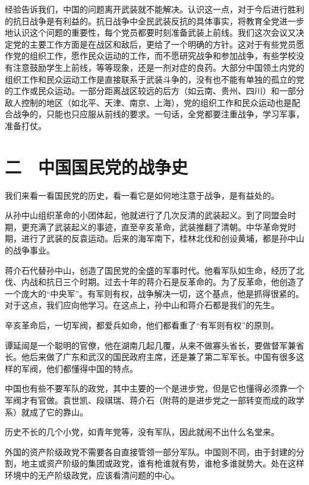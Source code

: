 经验告诉我们，中国的问题离开武装就不能解决。认识这一点，对于今后进行胜利的抗日战争是有利益的。抗日战争中全民武装反抗的具体事实，将教育全党进一步地认识这个问题的重要性，每个党员都要时刻准备武装上前线。我们这次会议又决定党的主要工作方面是在战区和敌后，更给了一个明确的方针。这对于有些党员愿作党的组织工作，愿作民众运动的工作，而不愿研究战争和参加战争，有些学校没有注意鼓励学生上前线，等等现象，还是一剂对症的良药。大部分中国领土内党的组织工作和民众运动工作是直接联系于武装斗争的，没有也不能有单独的孤立的党的工作或民众运动。一部分距离战区较远的后方（如云南、贵州、四川）和一部分敌人控制的地区（如北平、天津、南京、上海），党的组织工作和民众运动也是配合战争的，只能也只应服从前线的要求。一句话，全党都要注重战争，学习军事，准备打仗。

\section{二　中国国民党的战争史}

我们来看一看国民党的历史，看一看它是如何地注意于战争，是有益处的。

从孙中山组织革命的小团体起，他就进行了几次反清的武装起义。到了同盟会时期，更充满了武装起义的事迹，直至辛亥革命，武装推翻了清朝。中华革命党时期，进行了武装的反袁运动。后来的海军南下，桂林北伐和创设黄埔，都是孙中山的战争事业。

蒋介石代替孙中山，创造了国民党的全盛的军事时代。他看军队如生命，经历了北伐、内战和抗日三个时期。过去十年的蒋介石是反革命的。为了反革命，他创造了一个庞大的“中央军”。有军则有权，战争解决一切，这个基点，他是抓得很紧的。对于这点，我们应向他学习。在这点上，孙中山和蒋介石都是我们的先生。

辛亥革命后，一切军阀，都爱兵如命，他们都看重了“有军则有权”的原则。

谭延闿是一个聪明的官僚，他在湖南几起几覆，从来不做寡头省长，要做督军兼省长。他后来做了广东和武汉的国民政府主席，还是兼了第二军军长。中国有很多这样的军阀，他们都懂得中国的特点。

中国也有些不要军队的政党，其中主要的一个是进步党，但是它也懂得必须靠一个军阀才有官做。袁世凯、段祺瑞、蒋介石（附蒋的是进步党之一部转变而成的政学系）就成了它的靠山。

历史不长的几个小党，如青年党等，没有军队，因此就闹不出什么名堂来。

外国的资产阶级政党不需要各自直接管领一部分军队。中国则不同，由于封建的分割，地主或资产阶级的集团或政党，谁有枪谁就有势，谁枪多谁就势大。处在这样环境中的无产阶级政党，应该看清问题的中心。

